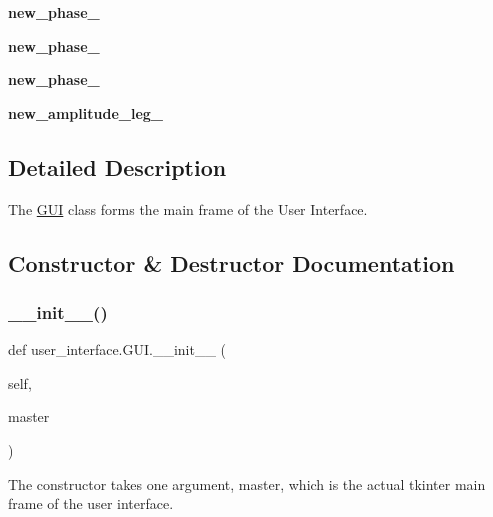 \begin{DoxyCompactItemize}
{\bfseries new\+\_\+phase\+\_}
\item 
\mbox{\label{classuser__interface_1_1GUI_ab708ec86f72d3e946dee006aadbc7e13}} 
{\bfseries new\+\_\+phase\+\_}
\item 
\mbox{\label{classuser__interface_1_1GUI_a8698af703cc3fc20bb710f91babf481f}} 
{\bfseries new\+\_\+phase\+\_}
\item 
\mbox{\label{classuser__interface_1_1GUI_a97c3ed54f517876b3304fb19fbfa83fe}} 
{\bfseries new\+\_\+amplitude\+\_\+leg\+\_}
\end{DoxyCompactItemize}


\subsection{Detailed Description}
The \hyperlink{classuser__interface_1_1GUI}{G\+UI} class forms the main frame of the User Interface. 

\subsection{Constructor \& Destructor Documentation}
\mbox{\label{classuser__interface_1_1GUI_a56cf4f384dbb041483a69bbe54f3e08a}} 
\subsubsection{\texorpdfstring{\+\_\+\+\_\+init\+\_\+\+\_\+()}{\_\_init\_\_()}}
{\footnotesize\ttfamily def user\+\_\+interface.\+G\+U\+I.\+\_\+\+\_\+init\+\_\+\+\_\+ (\begin{DoxyParamCaption}\item[{}]{self,  }\item[{}]{master }\end{DoxyParamCaption})}



The constructor takes one argument, master, which is the actual tkinter main frame of the user interface. 



